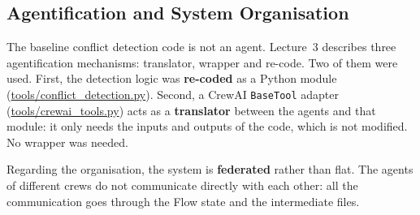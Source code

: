 \subsection{Agentification and System Organisation}\label{sec:agentification}

The baseline conflict detection code is not an agent. Lecture~3 \cite{urvlect3} describes three agentification mechanisms: translator, wrapper and re-code. Two of them were used. First, the detection logic was \textbf{re-coded} as a Python module (\url{tools/conflict_detection.py}). Second, a CrewAI \texttt{BaseTool} adapter (\url{tools/crewai_tools.py}) acts as a \textbf{translator} between the agents and that module: it only needs the inputs and outputs of the code, which is not modified. No wrapper was needed.

Regarding the organisation, the system is \textbf{federated} rather than flat. The agents of different crews do not communicate directly with each other: all the communication goes through the Flow state and the intermediate files.
